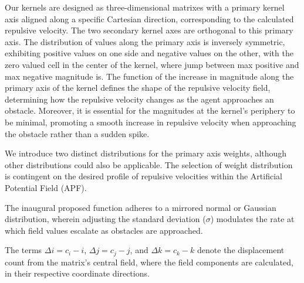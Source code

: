 \documentclass[letterpaper, 10 pt, conference]{ieeeconf}  %
\begin{document}

Our kernels are designed as three-dimensional matrixes with a primary kernel axis aligned along a specific Cartesian direction, corresponding to the calculated repulsive velocity. The two secondary kernel axes are orthogonal to this primary axis. The distribution of values along the primary axis is inversely symmetric, exhibiting positive values on one side and negative values on the other, with the zero valued cell in the center of the kernel, where jump between max positive and max negative magnitude is. The function of the increase in magnitude along the primary axis of the kernel defines the shape of the repulsive velocity field, determining how the repulsive velocity changes as the agent approaches an obstacle. Moreover, it is essential for the magnitudes at the kernel's periphery to be minimal, promoting a smooth increase in repulsive velocity when approaching the obstacle rather than a sudden spike.



%
%

We introduce two distinct distributions for the primary axis weights, although other distributions could also be applicable. The selection of weight distribution is contingent on the desired profile of repulsive velocities within the Artificial Potential Field (APF).

The inaugural proposed function adheres to a mirrored normal or Gaussian distribution, wherein adjusting the standard deviation (\(\sigma\)) modulates the rate at which field values escalate as obstacles are approached.

The terms \(\Delta i = c_i - i\), \(\Delta j = c_j - j\), and \(\Delta k = c_k - k\) denote the displacement count from the matrix's central field, where the field components are calculated, in their respective coordinate directions.
\end{document}
